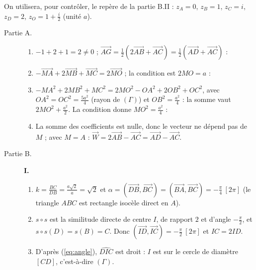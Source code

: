 \begin{corrige}
\begin{sol}
On utilisera, pour contrôler, le repère de la partie B.II : $z_A = 0$, $z_B = 1$, $z_C = i$, $z_D = 2$, $z_O = 1 + \frac{i}{2}$ (unité $a$).
\begin{description}
      \item[Partie A.]
      \begin{enumerate}
            \item $-1 + 2 + 1 = 2 \neq 0$ ; $\overrightarrow{AG} = \frac12(2\overrightarrow{AB} + \overrightarrow{AC}) = \frac12(\overrightarrow{AD} + \overrightarrow{AC})$ :
            \item $-\overrightarrow{MA} + 2\overrightarrow{MB} + \overrightarrow{MC} = 2\overrightarrow{MO}$ ; la condition est $2MO = a$ :
            \item $-MA^2 + 2MB^2 + MC^2 = 2MO^2 - OA^2 + 2OB^2 + OC^2$, avec $OA^2 = OC^2 = \frac{5a^2}{4}$ (rayon de $(\Gamma)$) et $OB^2 = \frac{a^2}{4}$ :
                  la somme vaut $2MO^2 + \frac{a^2}{2}$. La condition donne $MO^2 = \frac{a^2}{4}$ :
            \item La somme des coefficients est nulle, donc le vecteur ne dépend pas de $M$ ; avec $M = A$ :
                  $\overrightarrow{W} = 2\overrightarrow{AB} - \overrightarrow{AC} = \overrightarrow{AD} - \overrightarrow{AC}$. 
      \end{enumerate}
      \item[Partie B.]
      \textbf{I.}
      \begin{enumerate}
            \item $k = \frac{BC}{DB} = \frac{a\sqrt2}{a} = \sqrt2$ et
                  $\alpha = (\overrightarrow{DB},\overrightarrow{BC}) = (\overrightarrow{BA},\overrightarrow{BC}) = -\frac{\pi}{4}\ [2\pi]$
                  (le triangle $ABC$ est rectangle isocèle direct en $A$).
            \item $s \circ s$ est la similitude directe de centre $I$, de rapport $2$ et d'angle $-\frac{\pi}{2}$, et $s \circ s(D) = s(B) = C$.
                  Donc $(\overrightarrow{ID},\overrightarrow{IC}) = -\frac{\pi}{2}\ [2\pi]$ et $IC = 2ID$.
            \item D'après (\ref{eq:angle}), $\widehat{DIC}$ est droit : $I$ est sur le cercle de diamètre $[CD]$, c'est-à-dire $(\Gamma)$.

\end{enumerate}
\end{description}
\end{sol}
\end{corrige}
